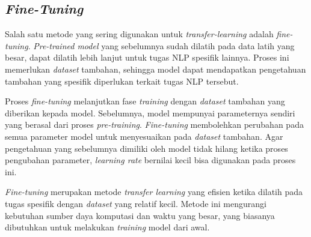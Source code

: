 \subsection{\textit{Fine-Tuning}}

Salah satu metode yang sering digunakan untuk \textit{transfer-learning} adalah \textit{fine-tuning}. \textit{Pre-trained model} yang sebelumnya sudah dilatih pada data latih yang besar, dapat dilatih lebih lanjut untuk tugas NLP spesifik lainnya. Proses ini memerlukan \textit{dataset} tambahan, sehingga model dapat mendapatkan pengetahuan tambahan yang spesifik diperlukan terkait tugas NLP tersebut.

Proses \textit{fine-tuning} melanjutkan fase \textit{training} dengan \textit{dataset} tambahan yang diberikan kepada model. Sebelumnya, model mempunyai parameternya sendiri yang berasal dari proses \textit{pre-training}. \textit{Fine-tuning} membolehkan perubahan pada semua parameter model untuk menyesuaikan pada \textit{dataset} tambahan. Agar pengetahuan yang sebelumnya dimiliki oleh model tidak hilang ketika proses pengubahan parameter, \textit{learning rate} bernilai kecil bisa digunakan pada proses ini.

\textit{Fine-tuning} merupakan metode \textit{transfer learning} yang efisien ketika dilatih pada tugas spesifik dengan \textit{dataset} yang relatif kecil. Metode ini mengurangi kebutuhan  sumber daya komputasi dan waktu yang besar, yang biasanya dibutuhkan untuk melakukan \textit{training} model dari awal.
